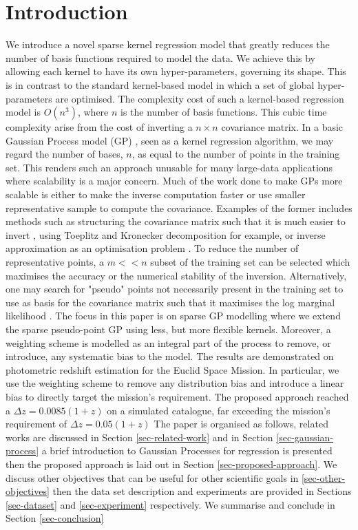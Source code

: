 \documentclass[a4paper,12pt]{article}
\begin{document}
\section{Introduction}
We introduce a novel sparse kernel regression model that greatly reduces the number of basis functions required to model the data. We achieve this by allowing each kernel to have its own hyper-parameters, governing its shape. This is in contrast to the standard kernel-based model in which a set of global hyper-parameters are optimised. The complexity cost of such a kernel-based regression model is $O(n^{3})$, where $n$ is the number of basis functions. This cubic time complexity arise from the cost of inverting a $n\times n$ covariance matrix. In a basic Gaussian Process model (GP) \cite{rasmussen+williams}, seen as a kernel regression algorithm, we may regard the number of bases, $n$, as equal to the number of points in the training set. This renders such an approach unusable for many large-data applications where scalability is a major concern. Much of the work done to make GPs more scalable \cite{sparseGPcitations} is either to make the inverse computation faster or use smaller representative sample to compute the covariance. Examples of the former includes methods such as structuring the covariance matrix such that it is much easier to invert \cite{}, using Toeplitz and Kronecker decomposition for example, or inverse approximation as an optimisation problem \cite{}. To reduce the number of representative points, a $m << n$ subset of the training set can be selected which maximises the accuracy or the numerical stability of the inversion. Alternatively, one may search for "pseudo" points not necessarily present in the training set to use as basis for the covariance matrix such that it maximises the log marginal likelihood \cite{}. The focus in this paper is on sparse GP modelling where we extend the sparse pseudo-point GP using less, but more flexible kernels. Moreover, a weighting scheme is modelled as an integral part of the process to remove, or introduce, any systematic bias to the model. The results are demonstrated on photometric redshift estimation for the Euclid Space Mission. In particular, we use the weighting scheme to remove any distribution bias and introduce a linear bias to directly target the mission's requirement. The proposed approach reached a $\Delta z = 0.0085(1+z)$ on a simulated catalogue, far exceeding the mission's requirement of $\Delta z = 0.05(1+z)$ The paper is organised as follows, related works are discussed in Section \ref{sec-related-work} and in Section \ref{sec-gaussian-process} a brief introduction to Gaussian Processes for regression is presented then the proposed approach is laid out in Section \ref{sec-proposed-approach}. We discuss other objectives that can be useful for other scientific goals in \ref{sec-other-objectives} then the data set description and experiments are provided in Sections \ref{sec-dataset} and \ref{sec-experiment} respectively. We summarise and conclude in Section \ref{sec-conclusion}
\end{document}
